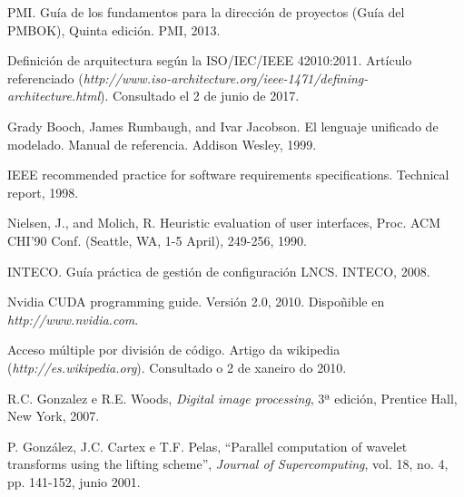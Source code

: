 

\begin{thebibliography}{99}
	
PMI. Guía de los fundamentos para la dirección de proyectos (Guía del PMBOK), Quinta edición. PMI, 2013. 	
	
 Definición de arquitectura según la ISO/IEC/IEEE 42010:2011. Artículo referenciado ({\it http://www.iso-architecture.org/ieee-1471/defining-architecture.html}). Consultado el 2 de junio de 2017.

Grady Booch, James Rumbaugh, and Ivar Jacobson. El lenguaje unificado de modelado. Manual
de referencia. Addison Wesley, 1999.

IEEE recommended practice for software requirements specifications. Technical report, 1998.

Nielsen, J., and Molich, R. Heuristic evaluation of user interfaces, Proc. ACM CHI'90 Conf. (Seattle, WA, 1-5 April), 249-256, 1990.

INTECO. Guía práctica de gestión de configuración LNCS. INTECO, 2008.

	
 Nvidia CUDA programming guide. Versión 2.0, 2010. Dispoñible en {\it http://www.nvidia.com}.

 Acceso múltiple por división de código. Artigo da wikipedia ({\it http://es.wikipedia.org}). Consultado o 2 de xaneiro do 2010.

 R.C. Gonzalez e R.E. Woods, {\it Digital image processing}, 3ª edición, Prentice Hall, New York, 2007.

 P. González, J.C. Cartex e T.F. Pelas, ``Parallel computation of wavelet transforms using the lifting scheme'', {\it Journal of Supercomputing}, vol. 18, no. 4, pp. 141-152, junio 2001.
\end{thebibliography}

